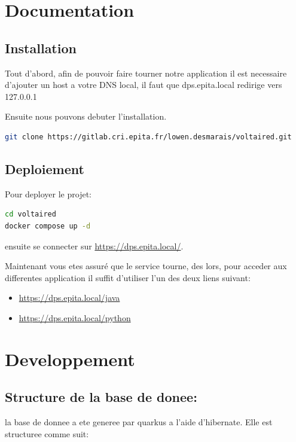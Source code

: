 \documentclass[a4paper, 12pt]{article}
\begin{document}
\section{Documentation}
\subsection{Installation}

Tout d'abord, afin de pouvoir faire tourner notre application il est 
necessaire d'ajouter un host a votre DNS local, il faut que 
dps.epita.local redirige vers 127.0.0.1

Ensuite nous pouvons debuter l'installation.

\begin{lstlisting}[language=sh]
git clone https://gitlab.cri.epita.fr/lowen.desmarais/voltaired.git
\end{lstlisting}

\subsection{Deploiement}
Pour deployer le projet:
\begin{lstlisting}[language=sh]
cd voltaired
docker compose up -d
\end{lstlisting}

ensuite se connecter sur \url{https://dps.epita.local/}.

Maintenant vous etes assuré que le service tourne, des lors, pour acceder 
aux differentes application il suffit d'utiliser l'un des deux liens suivant:
\begin{itemize}
    \item \url{https://dps.epita.local/java}
    \item \url{https://dps.epita.local/python}
\end{itemize}

\section{Developpement}

\subsection{Structure de la base de donee:}

la base de donnee a ete generee par quarkus a l'aide d'hibernate. Elle
est structuree comme suit:
\end{document}
